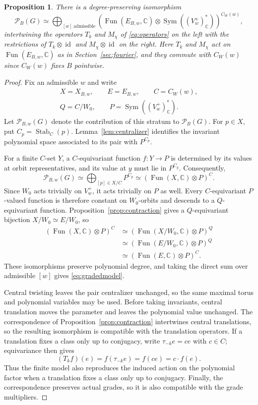\documentclass[11pt,a4paper,reqno]{amsart}
\theoremstyle{plain}
\newtheorem{proposition}[theorem]{Proposition}
\theoremstyle{definition}
\theoremstyle{remark}
\numberwithin{equation}{section}
\DeclareMathOperator{\Sym}{Sym}
\DeclareMathOperator{\Stab}{Stab}
\newcommand{\CC}{\mathbb C}
\newcommand{\cP}{\mathcal P}
\DeclareMathOperator{\Fun}{Fun}
\DeclareMathOperator{\id}{id}
\begin{document}
\begin{proposition}\label{prop:gradedmodel} There is a degree-preserving isomorphism
\begin{equation}\label{eq:gradedmodel}
\cP_B(G)\simeq\bigoplus_{[w]\ \mathrm{admissible}} \left(\Fun(E_{B,w},\CC)\otimes\Sym((V_w^+)_{\CC}^*)\right)^{C_W(w)},
\end{equation}
intertwining the operators $T_k$ and $M_\chi$ of \eqref{eq:operators} on the left with the restrictions of $T_k\otimes\id$ and $M_\chi\otimes\id$ on the right. Here $T_k$ and $M_\chi$ act on $\Fun(E_{B,w},\CC)$ as in Section~\ref{sec:fourier}, and they commute with $C_W(w)$ since $C_W(w)$ fixes $B$ pointwise.
\end{proposition}
\begin{proof}
Fix an admissible $w$ and write
\[
\begin{gathered}
X=X_{B,w},\qquad E=E_{B,w},\qquad C=C_W(w),\\
Q=C/W_0,\qquad P=\Sym((V_w^+)_{\CC}^*).
\end{gathered}
\]
Let $\cP_{B,w}(G)$ denote the contribution of this stratum to $\cP_B(G)$. For $p\in X$, put $C_p=\Stab_C(p)$. Lemma~\ref{lem:centralizer} identifies the invariant polynomial space associated to its pair with $P^{C_p}$.

For a finite $C$-set $Y$, a $C$-equivariant function $f\colon Y\to P$ is determined by its values at orbit representatives, and its value at $y$ must lie in $P^{C_y}$. Consequently,
\[
\cP_{B,w}(G) \simeq\bigoplus_{[p]\in X/C}P^{C_p} \simeq\left(\Fun(X,\CC)\otimes P\right)^C.
\]
Since $W_0$ acts trivially on $V_w^+$, it acts trivially on $P$ as well. Every $C$-equivariant $P$-valued function is therefore constant on $W_0$-orbits and descends to a $Q$-equivariant function. Proposition~\ref{prop:contraction} gives a $Q$-equivariant bijection $X/W_0\simeq E/W_0$, so
\[
\begin{aligned}
\left(\Fun(X,\CC)\otimes P\right)^C &\simeq\left(\Fun(X/W_0,\CC)\otimes P\right)^Q\\
&\simeq\left(\Fun(E/W_0,\CC)\otimes P\right)^Q\\
&\simeq\left(\Fun(E,\CC)\otimes P\right)^C.
\end{aligned}
\]
These isomorphisms preserve polynomial degree, and taking the direct sum over admissible $[w]$ gives \eqref{eq:gradedmodel}.

Central twisting leaves the pair centralizer unchanged, so the same maximal torus and polynomial variables may be used. Before taking invariants, central translation moves the parameter and leaves the polynomial value unchanged. The correspondence of Proposition~\ref{prop:contraction} intertwines central translations, so the resulting isomorphism is compatible with the translation operators. If a translation fixes a class only up to conjugacy, write $\tau_{-k}e=ce$ with $c\in C$; equivariance then gives
\[
(T_kf)(e)=f(\tau_{-k}e)=f(ce)=c\cdot f(e).
\]
Thus the finite model also reproduces the induced action on the polynomial factor when a translation fixes a class only up to conjugacy. Finally, the correspondence preserves actual grades, so it is also compatible with the grade multipliers.
\end{proof}
\end{document}
